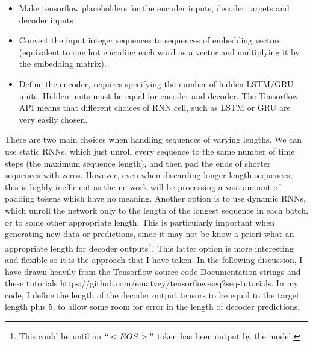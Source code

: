 \documentclass[]{article}
\begin{document}
\begin{itemize}
	\item Make tensorflow placeholders for the encoder inputs, decoder targets and decoder inputs
	\item Convert the input integer sequences to sequences of embedding vectors (equivalent to one hot encoding each word as a vector and multiplying it by the embedding matrix).
	\item Define the encoder, requires specifying the number of hidden LSTM/GRU units. Hidden units must be equal for encoder and decoder. The Tensorflow API means that different choices of RNN cell, such as LSTM or GRU are very easily chosen.
\end{itemize}
There are two main choices when handling sequences of varying lengths. We can use static RNNs, which just unroll every sequence to the same number of time steps (the maximum sequence length), and then pad the ends of shorter sequences with zeros. However, even when discarding longer length sequences, this is highly inefficient as the network will be processing a vast amount of padding tokens which have no meaning. Another option is to use dynamic RNNs, which unroll the network only to the length of the longest sequence in each batch, or to some other appropriate length. This is particularly important when generating new data or predictions, since it may not be know a priori what an appropriate length for decoder outputs\footnote{This could be until an $``<EOS>"$ token has been output by the model.}. This latter option is more interesting and flexible so it is the approach that I have taken. In the following discussion, I have drawn heavily from the Tensorflow source code Documentation strings and these tutorials https://github.com/ematvey/tensorflow-seq2seq-tutorials. In my code, I define the length of the decoder output tensors to be equal to the target length plus 5, to allow some room for error in the length of decoder predictions.
\end{document}
